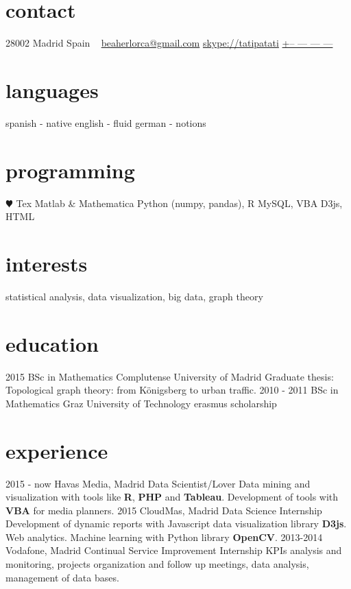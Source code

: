 \documentclass[]{friggeri-cv}
\begin{document}
\ifenglish
{}
       {}


\begin{aside}
  \section{contact}
    28002 Madrid
    Spain
    ~
    \href{mailto:beaherlorca@gmail.com}{beaherlorca@gmail.com}
    \href{skype:<tatipatati>[add]}{skype://tatipatati}
    \href{tel:xxxxxxxxxxx}{+-- --- --- ---}
  \section{languages}
    spanish - native
    english - fluid
    german - notions
  \section{programming}
    {\color{red} $\varheartsuit$} Tex
    Matlab \& Mathematica
    Python (numpy, pandas), R
    MySQL, VBA
    D3js, HTML
\end{aside}

\section{interests}

statistical analysis, data visualization, big data, graph theory

\section{education}

\begin{entrylist}
  \entry
    {2015}
    {BSc in Mathematics}
    {Complutense University of Madrid}
    {Graduate thesis: Topological graph theory: from Königsberg to urban traffic.}
  \entry
    {2010 - 2011}
    {BSc in Mathematics}
    {Graz University of Technology}
    {erasmus scholarship}
\end{entrylist}

\section{experience}

\begin{entrylist}
  \entry
    {2015 - now}
    {Havas Media, Madrid}
    {Data Scientist/Lover}
    {Data mining and visualization with tools like \textbf{R}, \textbf{PHP} and \textbf{Tableau}. Development of tools with \textbf{VBA} for media planners.}
  \entry
    {2015}
    {CloudMas, Madrid}
    {Data Science Internship}
    {Development of dynamic reports with Javascript data visualization library \textbf{D3js}. Web analytics. Machine learning with Python library \textbf{OpenCV}.}
  \entry
    {2013-2014}
    {Vodafone, Madrid}
    {Continual Service Improvement Internship}
    {KPIs analysis and monitoring, projects organization and follow up meetings, data analysis, management of data bases.}
\end{entrylist}
\end{document}
